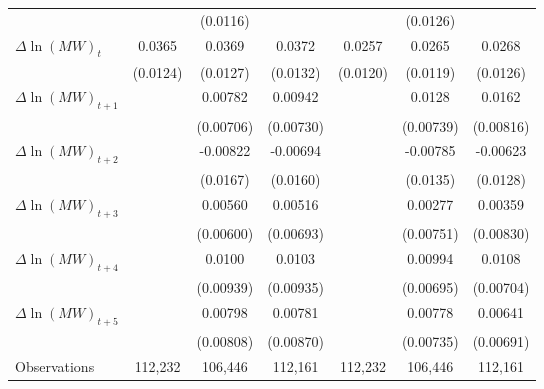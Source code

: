 {\begin{tabular}{l*{6}{c}}
          &                  & (0.0116)         &                  &                  & (0.0126)         &                  \\
[1em]
$\Delta \ln(MW)_{t}$&   0.0365\sym{***}&   0.0369\sym{***}&   0.0372\sym{***}&   0.0257\sym{**} &   0.0265\sym{**} &   0.0268\sym{**} \\
          & (0.0124)         & (0.0127)         & (0.0132)         & (0.0120)         & (0.0119)         & (0.0126)         \\
[1em]
$\Delta \ln(MW)_{t+1}$&                  &  0.00782         &  0.00942         &                  &   0.0128\sym{*}  &   0.0162\sym{*}  \\
          &                  &(0.00706)         &(0.00730)         &                  &(0.00739)         &(0.00816)         \\
[1em]
$\Delta \ln(MW)_{t+2}$&                  & -0.00822         & -0.00694         &                  & -0.00785         & -0.00623         \\
          &                  & (0.0167)         & (0.0160)         &                  & (0.0135)         & (0.0128)         \\
[1em]
$\Delta \ln(MW)_{t+3}$&                  &  0.00560         &  0.00516         &                  &  0.00277         &  0.00359         \\
          &                  &(0.00600)         &(0.00693)         &                  &(0.00751)         &(0.00830)         \\
[1em]
$\Delta \ln(MW)_{t+4}$&                  &   0.0100         &   0.0103         &                  &  0.00994         &   0.0108         \\
          &                  &(0.00939)         &(0.00935)         &                  &(0.00695)         &(0.00704)         \\
[1em]
$\Delta \ln(MW)_{t+5}$&                  &  0.00798         &  0.00781         &                  &  0.00778         &  0.00641         \\
          &                  &(0.00808)         &(0.00870)         &                  &(0.00735)         &(0.00691)         \\
\hline
Observations&  112,232         &  106,446         &  112,161         &  112,232         &  106,446         &  112,161         \\
\hline\hline
\end{tabular}
}
